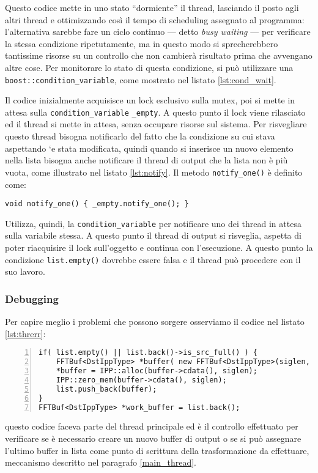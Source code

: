 Questo codice mette in uno stato ``dormiente'' il thread, lasciando il posto
agli altri thread e ottimizzando cos\`i il tempo di scheduling assegnato al
programma: l'alternativa sarebbe fare un ciclo continuo --- detto \emph{busy waiting} --- per verificare la stessa
condizione ripetutamente, ma in questo modo si sprecherebbero tantissime risorse
su un controllo che non cambier\`a risultato prima che avvengano altre cose. Per
monitorare lo stato di questa condizione, si pu\`o utilizzare una
\texttt{boost::condition\_variable}, come mostrato nel listato \ref{lst:cond_wait}.

Il codice inizialmente acquisisce un lock esclusivo sulla mutex, poi si mette in
attesa sulla \texttt{condition\_variable} \texttt{\_empty}. A questo punto
il lock viene rilasciato ed il thread si mette in attesa, senza occupare risorse
sul sistema. Per risvegliare questo thread bisogna notificarlo del fatto che la
condizione su cui stava aspettando `e stata modificata, quindi quando si
inserisce un nuovo elemento nella lista bisogna anche notificare il thread di
output che la lista non \`e pi\`u vuota, come illustrato nel listato
\ref{lst:notify}. Il metodo \texttt{notify\_one()} \`e definito come:
\begin{lstlisting}[frame=none]
    void notify_one() { _empty.notify_one(); }
\end{lstlisting}
Utilizza, quindi, la \texttt{condition\_variable} per notificare uno dei thread
in attesa sulla variabile stessa. A questo punto il thread di output si
risveglia, aspetta di poter riacquisire il lock sull'oggetto e continua con
l'esecuzione. A questo punto la condizione \texttt{list.empty()} dovrebbe
essere falsa e il thread pu\`o procedere con il suo lavoro.


\subsubsection{Debugging}
Per capire meglio i problemi che possono sorgere osserviamo il codice nel
listato \ref{lst:threrr}:
\begin{lstlisting}[numbers=left,frame=l,float,caption=Codice problematico nel caso
	di pi\`u threads attivi,label=lst:threrr]
if( list.empty() || list.back()->is_src_full() ) {
	FFTBuf<DstIppType> *buffer( new FFTBuf<DstIppType>(siglen, sums) );
	*buffer = IPP::alloc(buffer->cdata(), siglen);
	IPP::zero_mem(buffer->cdata(), siglen);
	list.push_back(buffer);
}
FFTBuf<DstIppType> *work_buffer = list.back();
\end{lstlisting}
questo codice faceva parte del thread principale ed \`e il controllo effettuato
per verificare se \`e necessario creare un nuovo buffer di output o se si pu\`o
assegnare l'ultimo buffer in lista come punto di scrittura della trasformazione
da effettuare, meccanismo descritto nel paragrafo \ref{main_thread}.
